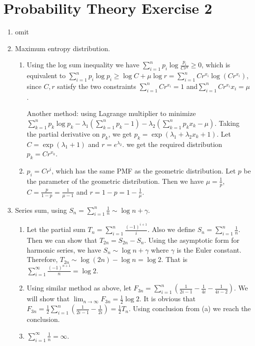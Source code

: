 \documentclass{article}
\begin{document}
\section{Probability Theory Exercise 2}
\begin{enumerate}
    \item omit
    \item Maximum entropy distribution.
\begin{enumerate}
    \item Using the log sum inequality we have
$\sum_{i=1}^n p_i\log \frac{p_i}{C r^u} \geq 0$,
which is equivalent to
$\sum_{i=1}^n p_i\log p_i \geq \log C + \mu \log r = \sum_{i=1}^n Cr^{x_i} \log (Cr^{x_i})$, since $C, r$ satisfy the two
constraints $\sum_{i=1}^n Cr^{x_i}=1$
and$\sum_{i=1}^n Cr^{x_i}x_i=\mu$.

Another method: using Lagrange multiplier to minimize
$\sum_{k=1}^n p_k \log p_k - \lambda_1 (\sum_{k=1}^n p_k-1) - \lambda_2 (\sum_{k=1}^n p_k x_k - \mu )$. Taking the partial derivative on $p_k$, we get
$p_k = \exp(\lambda_1 + \lambda_2 x_k + 1)$. Let $C=\exp(\lambda_1 + 1)$
and $r=e^{\lambda_2}$. we get the required distribution $p_k = C r^{x_k}$.
\item $p_i = Cr^i$, which has the same
PMF as the geometric distribution.
Let $p$ be the parameter of the
geometric distribution. Then
we have $\mu=\frac{1}{p}$,
$C=\frac{p}{1-p}=\frac{1}{\mu-1}$
and $r=1-p=1-\frac{1}{\mu}$.
\end{enumerate}
    
    \item Series sum, using $S_n = \sum_{i=1}^n \frac{1}{n} \sim \log n + \gamma$. \begin{enumerate}
    \item Let the partial sum $T_{n}=\sum_{i=1}^n \frac{(-1)^{i+1}}{i}$.
    Also we define
    $S_{n}=\sum_{i=1}^n \frac{1}{n}$.
    Then we can show that
    $T_{2n}=S_{2n} - S_n$. Using the asymptotic form for harmonic series,
    we have $S_n \sim \log n + \gamma$ where
    $\gamma$ is the Euler constant.
    Therefore, $T_{2n} \sim \log (2n) - \log n  = \log2$. That is
    $\sum_{i=1}^{\infty} \frac{(-1)^{n+1}}{n}=\log 2$.
    \item Using similar method as above, let $F_{3n} = \sum_{i=1}^n (\frac{1}{2i-1} - \frac{1}{4i} - \frac{1}{4i-2})$.
    We will 
    show that
    $
    \lim_{n\to\infty}F_{3n} = \frac{1}{2}\log 2
    $.
    It is obvious that $F_{3n} = \frac{1}{2}\sum_{i=1}^n (\frac{1}{2i-1}
    -\frac{1}{2i})= \frac{1}{2} T_n$. Using conclusion from (a) we reach
    the conclusion.
\item $\sum_{i=1}^{\infty} \frac{1}{n}=\infty$.
\end{enumerate}
 

\end{enumerate}
\end{document}
